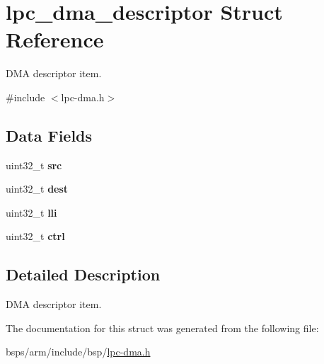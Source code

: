 \hypertarget{structlpc__dma__descriptor}{}\section{lpc\+\_\+dma\+\_\+descriptor Struct Reference}
\label{structlpc__dma__descriptor}


D\+MA descriptor item.  




{\ttfamily \#include $<$lpc-\/dma.\+h$>$}

\subsection*{Data Fields}
\begin{DoxyCompactItemize}
\item 
\mbox{\label{structlpc__dma__descriptor_a41123cc73864f779e6cb351166519ba8}} 
uint32\+\_\+t {\bfseries src}
\item 
\mbox{\label{structlpc__dma__descriptor_a8d102c4157d8e400eee173ec5f6621c6}} 
uint32\+\_\+t {\bfseries dest}
\item 
\mbox{\label{structlpc__dma__descriptor_a71250ba6406f2955d54ccae70b1f0863}} 
uint32\+\_\+t {\bfseries lli}
\item 
\mbox{\label{structlpc__dma__descriptor_a88b43c51c1ac082b993c45d0a2afade1}} 
uint32\+\_\+t {\bfseries ctrl}
\end{DoxyCompactItemize}


\subsection{Detailed Description}
D\+MA descriptor item. 

The documentation for this struct was generated from the following file\+:\begin{DoxyCompactItemize}
\item 
bsps/arm/include/bsp/\mbox{\hyperlink{lpc-dma_8h}{lpc-\/dma.\+h}}\end{DoxyCompactItemize}
